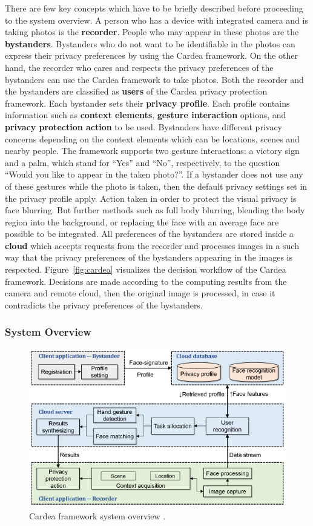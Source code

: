 \documentclass[conference]{IEEEtran}
\begin{document}
There are few key concepts which have to be briefly described before proceeding to the system overview. A person who has a device with integrated camera and is taking photos is the \textbf{recorder}. People who may appear in these photos are the \textbf{bystanders}. Bystanders who do not want to be identifiable in the photos can express their privacy preferences by using the Cardea framework. On the other hand, the recorder who cares and respects the privacy preferences of the bystanders can use the Cardea framework to take photos. Both the recorder and the bystanders are classified as \textbf{users} of the Cardea privacy protection framework. Each bystander sets their \textbf{privacy profile}. Each profile contains information such as \textbf{context elements}, \textbf{gesture interaction} options, and \textbf{privacy protection action} to be used. Bystanders have different privacy concerns depending on the context elements which can be locations, scenes and nearby people. The framework supports two gesture interactions: a victory sign and a palm, which stand for “Yes” and “No”, respectively, to the question “Would you like to appear in the taken photo?”. If a bystander does not use any of these gestures while the photo is taken, then the default privacy settings set in the privacy profile apply. Action taken in order to protect the visual privacy is face blurring. But further methods such as full body blurring, blending the body region into the background, or replacing the face with an average face are possible to be integrated. All preferences of the bystanders are stored inside a \textbf{cloud} which accepts requests from the recorder and processes images in a such way that the privacy preferences of the bystanders appearing in the images is respected. Figure~\ref{fig:cardea} visualizes the decision workflow of the Cardea framework. Decisions are made according to the computing results from the camera and remote cloud, then the original image is processed, in case it contradicts the privacy preferences of the bystanders. 

\subsubsection{System Overview}
\begin{figure}[t]
\centerline{\includegraphics[width=.5\textwidth]{img/cardea_overview_diagram.png}}
\caption{Cardea framework system overview \cite{shu2016cardea}.}
\label{fig:cardea2}
\end{figure}
\end{document}
